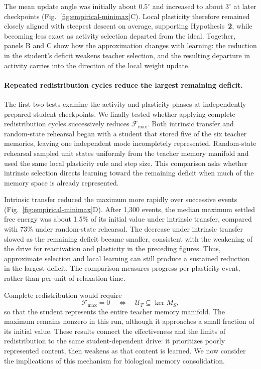 \documentclass[10pt,letterpaper]{article}
\theoremstyle{plain}
\theoremstyle{remark}
\begin{document}
The mean update angle was initially about \(0.5^\circ\) and increased to about \(3^\circ\) at later checkpoints (Fig.~\ref{fig:empirical-minimax}C). Local plasticity therefore remained closely aligned with steepest descent on average, supporting Hypothesis~\textbf{2}, while becoming less exact as activity selection departed from the ideal. Together, panels B and C show how the approximation changes with learning: the reduction in the student's deficit weakens teacher selection, and the resulting departure in activity carries into the direction of the local weight update.

\paragraph{Repeated redistribution cycles reduce the largest remaining deficit.}
The first two tests examine the activity and plasticity phases at independently prepared student checkpoints. We finally tested whether applying complete redistribution cycles successively reduces \(\mathcal F_{\max}\). Both intrinsic transfer and random-state rehearsal began with a student that stored five of the six teacher memories, leaving one independent mode incompletely represented. Random-state rehearsal sampled unit states uniformly from the teacher memory manifold and used the same local plasticity rule and step size. This comparison asks whether intrinsic selection directs learning toward the remaining deficit when much of the memory space is already represented.

Intrinsic transfer reduced the maximum more rapidly over successive events (Fig.~\ref{fig:empirical-minimax}D). After 1,300 events, the median maximum settled free energy was about 1.5\% of its initial value under intrinsic transfer, compared with 73\% under random-state rehearsal. The decrease under intrinsic transfer slowed as the remaining deficit became smaller, consistent with the weakening of the drive for reactivation and plasticity in the preceding figures. Thus, approximate selection and local learning can still produce a sustained reduction in the largest deficit. The comparison measures progress per plasticity event, rather than per unit of relaxation time.

Complete redistribution would require
\begin{equation}
\mathcal F_{\max}=0\quad\Longleftrightarrow\quad\mathcal U_T\subseteq\ker M_S,
\label{eq:empirical-completion}
\end{equation}
so that the student represents the entire teacher memory manifold. The maximum remains nonzero in this run, although it approaches a small fraction of its initial value. These results connect the effectiveness and the limits of redistribution to the same student-dependent drive: it prioritizes poorly represented content, then weakens as that content is learned. We now consider the implications of this mechanism for biological memory consolidation.
\end{document}
